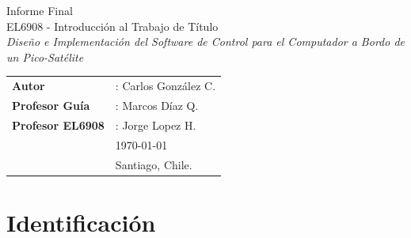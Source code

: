 \documentclass[11pt,letterpaper]{article}
\begin{document}
\newpage
\pagestyle{fancy}
\fancyhf{}
\vspace*{6cm}
\begin{center}
\Huge  {Informe Final} \\
\vspace{1cm}
\huge {EL6908 - Introducción al Trabajo de Título}\\
\vspace{1cm}
\huge {\textit{Diseño e Implementación del Software de Control para el Computador a Bordo de un Pico-Satélite}}\\
\end{center}
\vfill
\begin{flushright}
\begin{tabular}{ll}
\textbf{Autor} &: Carlos González C.\\
\textbf{Profesor Guía} &: Marcos Díaz Q.\\
\textbf{Profesor EL6908} &: Jorge Lopez H.\\
& \today\\
& Santiago, Chile.
\end{tabular}
\end{flushright}

\newpage
\pagestyle{fancy}
\fancyhf{}
\fancyhead[R]{\small \rm \textbf{\thepage}}
\renewcommand{\sectionmark}[1]{\markright{\thesection.\ #1}}
\renewcommand{\headrulewidth}{0.5pt}
\renewcommand{\footrulewidth}{0.5pt}


\tableofcontents
\listoffigures

\newpage
\section{Identificación}
\end{document}
